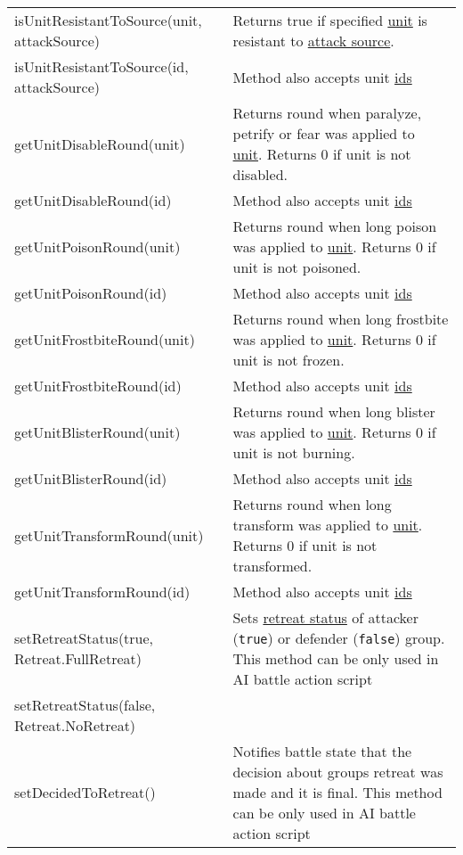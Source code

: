 \begin{center}
\begin{tabularx}{\linewidth}{| l | X |}
\hline
isUnitResistantToSource(unit, attackSource) & Returns true if specified \hyperref[Unit]{unit} is resistant to \hyperref[SourceCategory]{attack source}.\\
isUnitResistantToSource(id, attackSource) & Method also accepts unit \hyperref[Id]{ids}\\
\hline
getUnitDisableRound(unit) & Returns round when paralyze, petrify or fear was applied to \hyperref[Unit]{unit}. Returns 0 if unit is not disabled.\\
getUnitDisableRound(id) & Method also accepts unit \hyperref[Id]{ids}\\
\hline
getUnitPoisonRound(unit) & Returns round when long poison was applied to \hyperref[Unit]{unit}. Returns 0 if unit is not poisoned.\\
getUnitPoisonRound(id) & Method also accepts unit \hyperref[Id]{ids}\\
\hline
getUnitFrostbiteRound(unit) & Returns round when long frostbite was applied to \hyperref[Unit]{unit}. Returns 0 if unit is not frozen.\\
getUnitFrostbiteRound(id) & Method also accepts unit \hyperref[Id]{ids}\\
\hline
getUnitBlisterRound(unit) & Returns round when long blister was applied to \hyperref[Unit]{unit}. Returns 0 if unit is not burning.\\
getUnitBlisterRound(id) & Method also accepts unit \hyperref[Id]{ids}\\
\hline
getUnitTransformRound(unit) & Returns round when long transform was applied to \hyperref[Unit]{unit}. Returns 0 if unit is not transformed.\\
getUnitTransformRound(id) & Method also accepts unit \hyperref[Id]{ids}\\
\hline
setRetreatStatus(true, Retreat.FullRetreat) & Sets \hyperref[Retreat]{retreat status} of attacker (\texttt{true}) or defender (\texttt{false}) group. This method can be only used in AI battle action script\\
setRetreatStatus(false, Retreat.NoRetreat) &\\
\hline
setDecidedToRetreat() & Notifies battle state that the decision about groups retreat was made and it is final. This method can be only used in AI battle action script\\
\hline
\end{tabularx}
\end{center}
